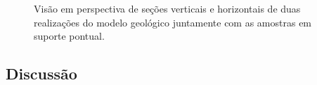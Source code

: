 \begin{figure}[H]
	\caption{ Visão em perspectiva de seções verticais e horizontais de duas realizações do modelo geológico juntamente com as amostras em suporte pontual.}\label{cobre_reals}
	\centering
	\hspace{1em}
\end{figure}

\subsection{Discussão}


